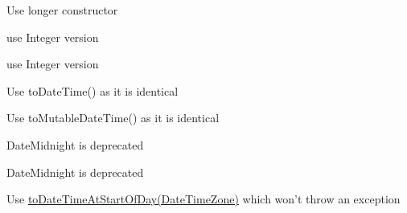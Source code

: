 \begin{DoxyRefList}
\item[\label{deprecated__deprecated000007}%
\hypertarget{deprecated__deprecated000007}{}%
Member \hyperlink{classorg_1_1joda_1_1time_1_1format_1_1_date_time_parser_bucket_a592a00ec9175a3cd84bce739ef4083ae}{org.joda.time.format.Date\-Time\-Parser\-Bucket.Date\-Time\-Parser\-Bucket} (long instant\-Local, Chronology chrono, Locale locale)]Use longer constructor  
\item[\label{deprecated__deprecated000009}%
\hypertarget{deprecated__deprecated000009}{}%
Member \hyperlink{classorg_1_1joda_1_1time_1_1format_1_1_date_time_parser_bucket_a05d39ffec6143eb80320d437694702c1}{org.joda.time.format.Date\-Time\-Parser\-Bucket.get\-Offset} ()]use Integer version  
\item[\label{deprecated__deprecated000010}%
\hypertarget{deprecated__deprecated000010}{}%
Member \hyperlink{classorg_1_1joda_1_1time_1_1format_1_1_date_time_parser_bucket_a9bdf3b4b79e524fc13daf0e0168cfd19}{org.joda.time.format.Date\-Time\-Parser\-Bucket.set\-Offset} (int offset)]use Integer version  
\item[\label{deprecated__deprecated000011}%
\hypertarget{deprecated__deprecated000011}{}%
Member \hyperlink{classorg_1_1joda_1_1time_1_1_instant_a13044ac592e993af07a3ac2d471775ab}{org.joda.time.Instant.to\-Date\-Time\-I\-S\-O} ()]Use to\-Date\-Time() as it is identical  
\item[\label{deprecated__deprecated000012}%
\hypertarget{deprecated__deprecated000012}{}%
Member \hyperlink{classorg_1_1joda_1_1time_1_1_instant_a17ed769b8460d9d768e0912e24449feb}{org.joda.time.Instant.to\-Mutable\-Date\-Time\-I\-S\-O} ()]Use to\-Mutable\-Date\-Time() as it is identical  
\item[\label{deprecated__deprecated000015}%
\hypertarget{deprecated__deprecated000015}{}%
Member \hyperlink{classorg_1_1joda_1_1time_1_1_local_date_a4330474a2517c4cb5eebd4d403de5a2e}{org.joda.time.Local\-Date.to\-Date\-Midnight} ()]Date\-Midnight is deprecated  
\item[\label{deprecated__deprecated000016}%
\hypertarget{deprecated__deprecated000016}{}%
Member \hyperlink{classorg_1_1joda_1_1time_1_1_local_date_a77df4e770b2d6e8eb14e8bc492a074a1}{org.joda.time.Local\-Date.to\-Date\-Midnight} (Date\-Time\-Zone zone)]Date\-Midnight is deprecated  
\item[\label{deprecated__deprecated000014}%
\hypertarget{deprecated__deprecated000014}{}%
Member \hyperlink{classorg_1_1joda_1_1time_1_1_local_date_a0e9631daef31c0cff6fee24c838a5c08}{org.joda.time.Local\-Date.to\-Date\-Time\-At\-Midnight} (Date\-Time\-Zone zone)]Use \hyperlink{}{to\-Date\-Time\-At\-Start\-Of\-Day(\-Date\-Time\-Zone)} which won't throw an exception  

\end{DoxyRefList}
